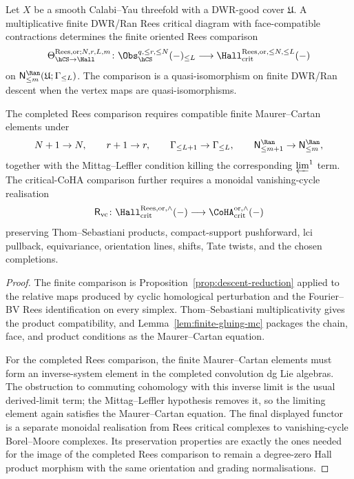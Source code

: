 \begin{proposition}
\label{thm:global-coha-limit}
Let $X$ be a smooth Calabi--Yau threefold with a DWR-good cover
$\mathfrak U$. A multiplicative finite DWR/Ran Rees critical diagram
with face-compatible contractions determines the finite oriented Rees
comparison
\[
 \Theta_{\hCS\to\Hall}^{\mathrm{Rees},\mathrm{or};N,r,L,m}\colon
 \Obs_{\hCS}^{q,\le r,\le N}(-)_{\le L}
 \longrightarrow
 \Hall_{\mathrm{crit}}^{\mathrm{Rees},\mathrm{or},\le N,\le L}(-)
\]
on $\mathsf N^{\Ran}_{\le m}(\mathfrak U;\Gamma_{\le L})$. The
comparison is a quasi-isomorphism on finite DWR/Ran descent when the
vertex maps are quasi-isomorphisms.

The completed Rees comparison requires compatible finite
Maurer--Cartan elements under
\[
 N+1\to N,\qquad r+1\to r,\qquad
 \Gamma_{\le L+1}\to\Gamma_{\le L},\qquad
 \mathsf N^{\Ran}_{\le m+1}\to\mathsf N^{\Ran}_{\le m},
\]
together with the Mittag--Leffler condition killing the corresponding
$\varprojlim^1$ term. The critical-CoHA comparison further requires a
monoidal vanishing-cycle realisation
\[
 \mathsf R_{\mathrm{vc}}\colon
 \Hall_{\mathrm{crit}}^{\mathrm{Rees},\mathrm{or},\wedge}(-)
 \longrightarrow
 \CoHA_{\mathrm{crit}}^{\mathrm{or},\wedge}(-)
\]
preserving Thom--Sebastiani products, compact-support pushforward, lci
pullback, equivariance, orientation lines, shifts, Tate twists, and the
chosen completions.
\end{proposition}

\begin{proof}
The finite comparison is Proposition~\ref{prop:descent-reduction}
applied to the relative maps produced by cyclic homological
perturbation and the Fourier--BV Rees identification on every simplex.
Thom--Sebastiani multiplicativity gives the product compatibility, and
Lemma~\ref{lem:finite-gluing-mc} packages the chain, face, and product
conditions as the Maurer--Cartan equation.

For the completed Rees comparison, the finite Maurer--Cartan elements
must form an inverse-system element in the completed convolution dg Lie
algebras. The obstruction to commuting cohomology with this inverse
limit is the usual derived-limit term; the Mittag--Leffler hypothesis
removes it, so the limiting element again satisfies the
Maurer--Cartan equation. The final displayed functor is a separate
monoidal realisation from Rees critical complexes to vanishing-cycle
Borel--Moore complexes. Its preservation properties are exactly the
ones needed for the image of the completed Rees comparison to remain a
degree-zero Hall product morphism with the same orientation and grading
normalisations.
\end{proof}

